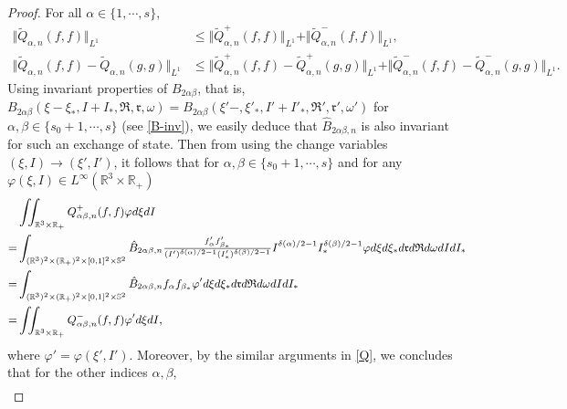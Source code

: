 \documentclass[reqno,11pt]{amsart}
\numberwithin{equation}{section}
\def\R{\mathbb{R}}
\begin{document}
\begin{proof}
	For all $\alpha \in \{ 1,\cdots , s \},$
	\begin{equation*}
		\begin{aligned}
			\Vert \tilde{Q}_{\alpha , n} (f,f) \Vert_{L^1} 
			&\leq \Vert \tilde{Q}^+_{\alpha , n} (f,f) \Vert_{L^1} + \Vert \tilde{Q}^-_{\alpha , n} (f,f) \Vert_{L^1} ,\\
			\Vert \tilde{Q}_{\alpha , n} (f,f) -\tilde{Q}_{\alpha , n} (g,g ) \Vert_{L^1} 
			&\leq \Vert \tilde{Q}^+_{\alpha , n} (f,f) -\tilde{Q}^+_{\alpha , n} (g,g ) \Vert_{L^1} +\Vert \tilde{Q}^-_{\alpha , n} (f,f) -\tilde{Q}^-_{\alpha , n} (g,g ) \Vert_{L^1}.
		\end{aligned}
	\end{equation*}
   Using invariant properties of $B_{2\alpha \beta }$, that is, $B_{2\alpha \beta }(\xi - \xi_*,I+I_*,\mathfrak{R},\mathfrak{r},\omega) =B_{2\alpha \beta }(\xi' - ,\xi'_*,I'+I'_*,\mathfrak{R}',\mathfrak{r}',\omega')$ for $\alpha, \beta \in \{ s_0 + 1, \cdots, s \}$ (see  \eqref{B-inv}), we easily deduce that $\hat{B}_{2\alpha \beta,n }$ is also invariant for such an exchange of state. Then from using the change variables $(\xi ,I)\rightarrow (\xi',I')$, it follows that for $\alpha, \beta \in \{ s_0 + 1, \cdots, s \}$ and for any $\varphi(\xi,I) \in L^\infty ( \R^3\times \R_+)$ 
	\begin{equation}\label{Q}{\small
	\begin{aligned}
	&\iint_{ \R^3\times \R_+}Q^+_{\alpha \beta ,n}(f,f) \varphi d\xi dI\\
	=&\int_{(\R^3)^2 \times(\R_+)^2 \times [0,1]^2 \times \mathbb{S}^2 } \hat{B}_{2 \alpha \beta ,n} \tfrac{f'_\alpha f'_{\beta_*}}{(I')^{\delta(\alpha)/2-1} (I'_* )^{\delta(\beta)/2-1}}
	 I^{\delta(\alpha)/2-1 } I_*^{\delta (\beta )/2-1}\varphi d\xi d\xi_* d \mathfrak{r} d \mathfrak{R} d \omega dI dI_*\\
	=& \int_{(\R^3)^2 \times(\R_+)^2 \times [0,1]^2 \times \mathbb{S}^2 }\hat{B}_{2 \alpha \beta ,n} f_\alpha f_{\beta_*} 
	\varphi' d\xi d\xi_* d \mathfrak{r} d \mathfrak{R} d \omega dI dI_* \\
	= & \iint_{ \R^3\times \R_+} Q^-_{ \alpha \beta,n }(f,f) \varphi' d \xi dI,
	\end{aligned}}
	\end{equation}
	where $\varphi '= \varphi (\xi',I')$. Moreover, by the similar arguments in \eqref{Q}, we concludes that for the other indices $\alpha,\beta$,
\begin{equation*}
  \begin{aligned}

\end{aligned}
\end{equation*}
\end{proof}
\end{document}
